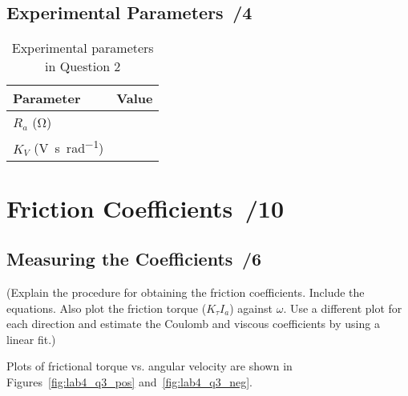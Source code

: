 \documentclass{article}
\newcommand{\score}{\hfill \underline{\hspace{0.65cm}}\,/} %
\begin{document}
\subsection{Experimental Parameters \score 4}
\begin{table}[phtb] 
\begin{center}
\caption{Experimental parameters in Question 2}
\label{tbl:lab4_q2_2}
\begin{tabular}{l|r} \hline \hline
\cellcolor{lightgray} Parameter & \cellcolor{lightgray} Value \\
\hline
$R_a$ (\si{\ohm}) &  \\ \hline
$K_V$ (\si{\volt\second\per\radian}) &  \\ \hline
\end{tabular}
\end{center}
\end{table}

\section{Friction Coefficients \score 10}
\subsection{Measuring the Coefficients \score 6}
(Explain the procedure for obtaining the friction coefficients. Include the equations. Also plot the friction torque ($K_{\tau}I_a$) against $\omega$. Use a different plot for each direction and estimate the Coulomb and viscous coefficients by using a linear fit.) 

Plots of frictional torque vs. angular velocity are shown in Figures~\ref{fig:lab4_q3_pos} and~\ref{fig:lab4_q3_neg}.
 
\end{document}

